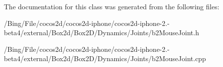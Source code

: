 The documentation for this class was generated from the following files\-:\begin{DoxyCompactItemize}
\item 
/\-Bing/\-File/cocos2d/cocos2d-\/iphone/cocos2d-\/iphone-\/2.-\/beta4/external/\-Box2d/\-Box2\-D/\-Dynamics/\-Joints/b2\-Mouse\-Joint.\-h\item 
/\-Bing/\-File/cocos2d/cocos2d-\/iphone/cocos2d-\/iphone-\/2.-\/beta4/external/\-Box2d/\-Box2\-D/\-Dynamics/\-Joints/b2\-Mouse\-Joint.\-cpp\end{DoxyCompactItemize}
